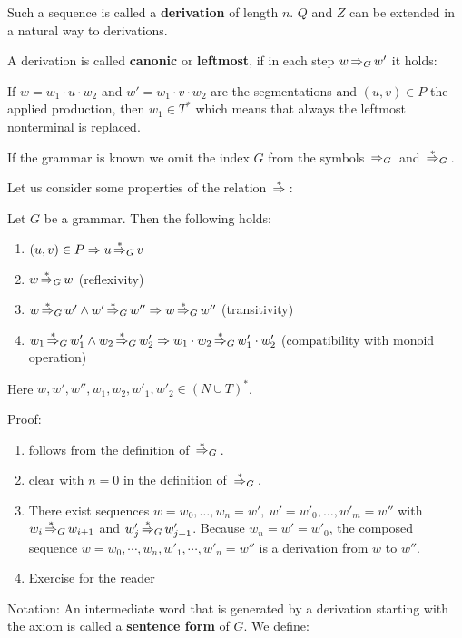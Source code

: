 Such a sequence is called a {\bf derivation} of length $n$. $Q$ and $Z$ can be
extended in a natural way to derivations.

A derivation is called {\bf canonic} or {\bf leftmost}, if in each step $w
\mbox{\,$\Rightarrow_{G}$\,} w'$ it holds:

If $w = w_1 \cdot u \cdot w_2$ and $w' = w_1 \cdot v \cdot w_2$ are the
segmentations and $(u, v) \in P$ the applied production, then $w_1 \in T^*$
which means that always the leftmost nonterminal is replaced.

If the grammar is known we omit the index $G$ from the symbols $\mbox{\,$\Rightarrow_{G}$\,}$
and $\mbox{\,$\stackrel{*}{\Rightarrow}_{G}$\,}$.

Let us consider some properties of the relation $\mbox{\,$\stackrel{*}{\Rightarrow}_{}$\,}$:

\begin{lemma}
Let $G$ be a grammar. Then the following holds:
\begin{enumerate}
  \item $(u, v) \in P \Rightarrow u \mbox{\,$\stackrel{*}{\Rightarrow}_{G}$\,} v$
  \item $w \mbox{\,$\stackrel{*}{\Rightarrow}_{G}$\,} w$ (reflexivity)
  \item $w \mbox{\,$\stackrel{*}{\Rightarrow}_{G}$\,} w' \wedge w' \mbox{\,$\stackrel{*}{\Rightarrow}_{G}$\,} w'' \Rightarrow w \mbox{\,$\stackrel{*}{\Rightarrow}_{G}$\,}
  w''$ (transitivity)
  \item $w_1 \mbox{\,$\stackrel{*}{\Rightarrow}_{G}$\,} w'_1 \wedge w_2 \mbox{\,$\stackrel{*}{\Rightarrow}_{G}$\,} w'_2 \Rightarrow w_1 \cdot
  w_2 \mbox{\,$\stackrel{*}{\Rightarrow}_{G}$\,} w'_1 \cdot w'_2$ (compatibility with monoid operation)
\end{enumerate}
Here $w, w', w'', w_1, w_2, w'_1, w'_2 \in (N \cup T)^*$.
\end{lemma}

Proof:
\begin{enumerate}
  \item follows from the definition of $\mbox{\,$\stackrel{*}{\Rightarrow}_{G}$\,}$.
  \item clear with $n = 0$ in the definition of $\mbox{\,$\stackrel{*}{\Rightarrow}_{G}$\,}$.
  \item There exist sequences $w = w_0, \ldots, w_n = w',\ w' = w'_0, \ldots,
  w'_m = w''$ with $w_i \mbox{\,$\stackrel{*}{\Rightarrow}_{G}$\,} w_{i+1}$ and $w'_j \mbox{\,$\stackrel{*}{\Rightarrow}_{G}$\,} w'_{j+1}$.
  Because $w_n = w' = w'_0$, the composed sequence $w = w_0, \cdots, w_n, w'_1,
  \cdots, w'_n = w''$ is a derivation from $w$ to $w''$.
  \item Exercise for the reader
\end{enumerate}

Notation: An intermediate word that is generated by a derivation starting with
the axiom is called a {\bf sentence form} of $G$. We define:

